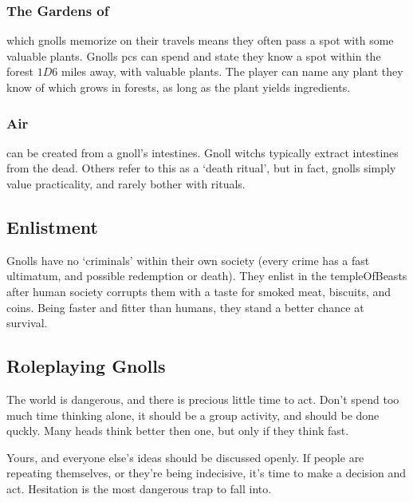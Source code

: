 \subsubsection{The Gardens of }
which gnolls memorize on their travels means they often pass a spot with some valuable plants.
Gnolls \glspl{pc} can spend  and state they know a spot within the forest $1D6$ miles away, with valuable plants.
The player can name any plant they know of which grows in forests, as long as the plant yields \glspl{ingredient}.

\subsubsection{Air }
can be created from a gnoll's intestines.
Gnoll \glspl{witch} typically extract intestines from the dead.
Others refer to this as a `death ritual', but in fact, gnolls simply value practicality, and rarely bother with rituals.

\subsection{Enlistment}

Gnolls have no `criminals' within their own society (every crime has a fast ultimatum, and possible redemption or death).
They enlist in the \gls{templeOfBeasts} after human society corrupts them with a taste for smoked meat, biscuits, and \glspl{coin}.
Being faster and fitter than humans, they stand a better chance at survival.

\subsection{Roleplaying Gnolls}

The world is dangerous, and there is precious little time to act. Don't spend too much time thinking alone, it should be a group activity, and should be done quckly. Many heads think better then one, but only if they think fast.

Yours, and everyone else's ideas should be discussed openly. If people are repeating themselves, or they're being indecisive, it's time to make a decision and act. Hesitation is the most dangerous trap to fall into.


